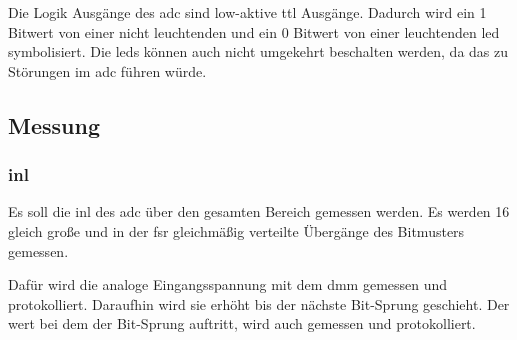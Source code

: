 \documentclass[12pt, a4paper, ngerman]{article}
\begin{document}
Die Logik Ausgänge des \ac{adc} sind low-aktive \ac{ttl} Ausgänge.
Dadurch wird ein 1 Bitwert von einer nicht leuchtenden und ein 0 Bitwert von einer leuchtenden \ac{led} symbolisiert.
Die \ac{led}s können auch nicht umgekehrt beschalten werden, da das zu Störungen im \ac{adc} führen würde.

\subsection{Messung}

\subsubsection{\acl{inl}}\label{sec:inl}

Es soll die \ac{inl} des \ac{adc} über den gesamten Bereich gemessen werden.
Es werden 16 gleich große und in der \ac{fsr} gleichmäßig verteilte Übergänge des Bitmusters gemessen.

Dafür wird die analoge Eingangsspannung mit dem \ac{dmm} gemessen und protokolliert.
Daraufhin wird sie erhöht bis der nächste Bit-Sprung geschieht.
Der wert bei dem der Bit-Sprung auftritt, wird auch gemessen und protokolliert.
\end{document}
